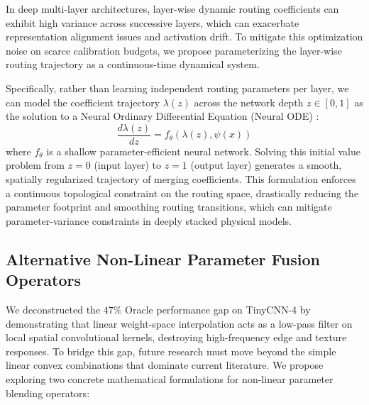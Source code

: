 In deep multi-layer architectures, layer-wise dynamic routing coefficients can exhibit high variance across successive layers, which can exacerbate representation alignment issues and activation drift. To mitigate this optimization noise on scarce calibration budgets, we propose parameterizing the layer-wise routing trajectory as a continuous-time dynamical system.

Specifically, rather than learning independent routing parameters per layer, we can model the coefficient trajectory $\lambda(z)$ across the network depth $z \in [0, 1]$ as the solution to a Neural Ordinary Differential Equation (Neural ODE) \cite{chen2018neural}:
\begin{equation}
    \frac{d\lambda(z)}{dz} = f_{\theta}(\lambda(z), \psi(x))
\end{equation}
where $f_{\theta}$ is a shallow parameter-efficient neural network. Solving this initial value problem from $z=0$ (input layer) to $z=1$ (output layer) generates a smooth, spatially regularized trajectory of merging coefficients. This formulation enforces a continuous topological constraint on the routing space, drastically reducing the parameter footprint and smoothing routing transitions, which can mitigate parameter-variance constraints in deeply stacked physical models.

\subsection{Alternative Non-Linear Parameter Fusion Operators}

We deconstructed the $47\%$ Oracle performance gap on TinyCNN-4 by demonstrating that linear weight-space interpolation acts as a low-pass filter on local spatial convolutional kernels, destroying high-frequency edge and texture responses. To bridge this gap, future research must move beyond the simple linear convex combinations that dominate current literature. We propose exploring two concrete mathematical formulations for non-linear parameter blending operators:

